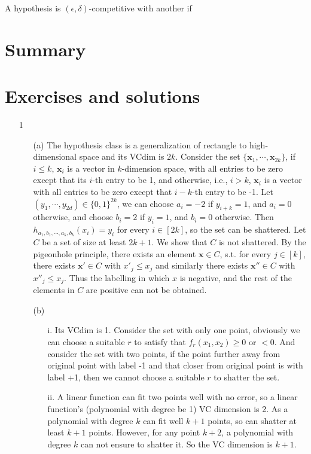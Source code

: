 \documentclass{article}
\begin{document}
A hypothesis is $(\epsilon, \delta)$-competitive with another if
\section{Summary}
%


\section{Exercises and solutions}

\newpage
\begin{itemize}
\item[1] \begin{itemize}
		\item[(a)] The hypothesis class is a generalization of rectangle to high-dimensional space and its VCdim is $2k$. Consider the set $\{\mathbf{x}_1,\cdots, \mathbf{x}_{2k}\}$, if $i\leq k$, $\mathbf{x}_i$ is a vector in $k$-dimension space, with all entries to be zero except that its $i$-th entry to be 1, and otherwise, i.e., $i>k$, $\mathbf{x}_i$ is a vector with all entries to be zero except that $i-k$-th entry to be -1. Let $(y_1,\cdots, y_{2d}) \in \{0, 1\}^{2k}$, we can choose $a_i = -2$ if $y_{i+k} = 1$, and $a_i = 0$ otherwise, and choose $b_i = 2$ if $y_i = 1$, and $b_i = 0$ otherwise. Then $h_{a_1,b_1,\cdots,a_k,b_k}(x_i) = y_i$ for every $i\in[2k]$, so the set can be shattered. 
		Let $C$ be a set of size at least $2k + 1$. We show that $C$ is not shattered. By the pigeonhole principle, there exists an
element $\mathbf{x}\in C$, s.t. for every $j \in [k]$, there exists $\mathbf{x}' \in C$ with $x'_j \leq x_j$ and similarly there exists $\mathbf{x}'' \in C$ with $x''_j \leq x_j$. Thus the labelling in which $x$ is negative, and the rest of the elements in $C$ are positive can not be obtained.
		\item[(b)]
			\begin{itemize}
			\item[i.] Its VCdim is 1. Consider the set with only one point, obviously we can choose a suitable $r$ to satisfy that $f_r(x_1,x_2)\geq 0$ or $<0$. And consider the set with two points, if the point further away from original point with label -1 and that closer from original point is with label +1, then we cannot choose a suitable $r$ to shatter the set. 
			\item[ii.] A linear function can fit two points well with no error, so a linear function's (polynomial with degree be 1) VC dimension is 2. As a polynomial with degree $k$ can fit well $k+1$ points, so can shatter at least $k+1$ points. However, for any point $k+2$, a polynomial with degree $k$ can not ensure to shatter it. So the VC dimension is $k+1$.

\end{itemize}
\end{itemize}
\end{itemize}
\end{document}
